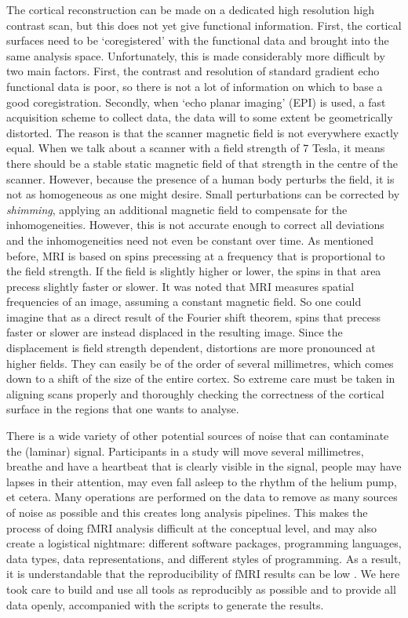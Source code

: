 The cortical reconstruction can be made on a dedicated high resolution high contrast scan, but this does not yet give functional information. First, the cortical surfaces need to be `coregistered' with the functional data and brought into the same analysis space. Unfortunately, this is made considerably more difficult by two main factors. First, the contrast and resolution of standard gradient echo functional data is poor, so there is not a lot of information on which to base a good coregistration. Secondly, when `echo planar imaging' (EPI) is used, a fast acquisition scheme to collect data, the data will to some extent be geometrically distorted. The reason is that the scanner magnetic field is not everywhere exactly equal. When we talk about a scanner with a field strength of 7 Tesla, it means there should be a stable static magnetic field of that strength in the centre of the scanner. However, because the presence of a human body perturbs the field, it is not as homogeneous as one might desire. Small perturbations can be corrected by \emph{shimming}, applying an additional magnetic field to compensate for the inhomogeneities. However, this is not accurate enough to correct all deviations and the inhomogeneities need not even be constant over time. As mentioned before, MRI is based on spins precessing at a frequency that is proportional to the field strength. If the field is slightly higher or lower, the spins in that area precess slightly faster or slower. It was noted that MRI measures spatial frequencies of an image, assuming a constant magnetic field. So one could imagine that as a direct result of the Fourier shift theorem, spins that precess faster or slower are instead displaced in the resulting image. Since the displacement is field strength dependent, distortions are more pronounced at higher fields. They can easily be of the order of several millimetres, which comes down to a shift of the size of the entire cortex. So extreme care must be taken in aligning scans properly and thoroughly checking the correctness of the cortical surface in the regions that one wants to analyse. %

There is a wide variety of other potential sources of noise that can contaminate the (laminar) signal. Participants in a study will move several millimetres, breathe and have a heartbeat that is clearly visible in the signal, people may have lapses in their attention, may even fall asleep to the rhythm of the helium pump, et cetera. Many operations are performed on the data to remove as many sources of noise as possible and this creates long analysis pipelines. This makes the process of doing fMRI analysis difficult at the conceptual level, and may also create a logistical nightmare: different software packages, programming languages, data types, data representations, and different styles of programming. As a result, it is understandable that the reproducibility of fMRI results can be low \cite{Nosek2015,Gorgolewski2016a}. We here took care to build and use all tools as reproducibly as possible and to provide all data openly, accompanied with the scripts to generate the results.

